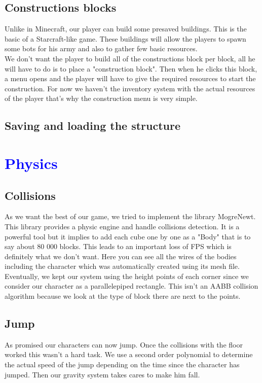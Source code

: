 \documentclass[article]{report}             %
\begin{document}
			\section{Constructions blocks}
				Unlike in Minecraft, our player can build some presaved buildings. This is the basic of a Starcraft-like game. These buildings will allow the players to spawn some bots for his army and also to gather few basic resources.\\

We don't want the player to build all of the constructions block per block, all he will have to do is to place a "construction block". Then when he clicks this block, a menu opens and the player will have to give the required resources to start the construction. For now we haven't the inventory system with the actual resources of the player that's why the construction menu is very simple.
			
			\section{Saving and loading the structure}
			
		\chapter{\textcolor{blue}{Physics}}
			\section{Collisions}
				As we want the best of our game, we tried to implement the library MogreNewt. This library provides a physic engine and handle collisions detection. It is a powerful tool but it implies to add each cube one by one as a "Body" that is to say about 80 000 blocks. This leads to an important loss of FPS which is definitely what we don't want. Here you can see all the wires of the bodies including the character which was automatically created using its mesh file.\\

Eventually, we kept our system using the height points of each corner since we consider our character as a parallelepiped rectangle. This isn't an AABB collision algorithm because we look at the type of block there are next to the points.

			\section{Jump}
				As promised our characters can now jump. Once the collisions with the floor worked this wasn't a hard task. We use a second order polynomial to determine the actual speed of the jump depending on the time since the character has jumped. Then our gravity system takes cares to make him fall.
				
\end{document}

